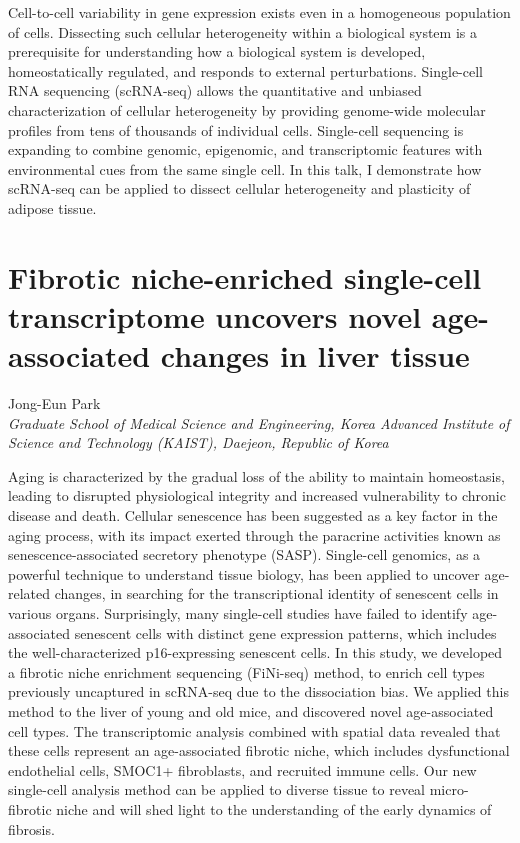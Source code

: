 \noindent
Cell-to-cell variability in gene expression exists even in a homogeneous population of cells. Dissecting such cellular heterogeneity within a biological system is a prerequisite for understanding how a biological system is developed, homeostatically regulated, and responds to external perturbations. Single-cell RNA sequencing (scRNA-seq) allows the quantitative and unbiased characterization of cellular heterogeneity by providing genome-wide molecular profiles from tens of thousands of individual cells. Single-cell sequencing is expanding to combine genomic, epigenomic, and transcriptomic features with environmental cues from the same single cell. In this talk, I demonstrate how scRNA-seq can be applied to dissect cellular heterogeneity and plasticity of adipose tissue. 
\newpage

\section*{Fibrotic niche-enriched single-cell transcriptome uncovers novel age-associated changes in liver tissue}

\begin{center}
Jong-Eun Park \\
\vspace{0.2cm}
\textit{Graduate School of Medical Science and Engineering, Korea Advanced Institute of Science and Technology (KAIST), Daejeon, Republic of Korea} \\
\end{center}

\noindent
Aging is characterized by the gradual loss of the ability to maintain homeostasis, leading to disrupted physiological integrity and increased vulnerability to chronic disease and death. Cellular senescence has been suggested as a key factor in the aging process, with its impact exerted through the paracrine activities known as senescence-associated secretory phenotype (SASP). Single-cell genomics, as a powerful technique to understand tissue biology, has been applied to uncover age-related changes, in searching for the transcriptional identity of senescent cells in various organs. Surprisingly, many single-cell studies have failed to identify age-associated senescent cells with distinct gene expression patterns, which includes the well-characterized p16-expressing senescent cells. In this study, we developed a fibrotic niche enrichment sequencing (FiNi-seq) method, to enrich cell types previously uncaptured in scRNA-seq due to the dissociation bias. We applied this method to the liver of young and old mice, and discovered novel age-associated cell types. The transcriptomic analysis combined with spatial data revealed that these cells represent an age-associated fibrotic niche, which includes dysfunctional endothelial cells, SMOC1+ fibroblasts, and recruited immune cells. Our new single-cell analysis method can be applied to diverse tissue to reveal micro-fibrotic niche and will shed light to the understanding of the early dynamics of fibrosis.
\newpage

